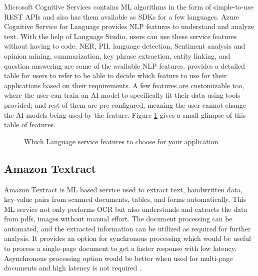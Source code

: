 Microsoft Cognitive Services contains \acs{ML} algorithms in the form of simple-to-use \acs{REST} \acs{API}s and also has them available as \acs{SDK}s for a few languages\cite{azureCogServices}. Azure Cognitive Service for Language\cite{urlAzureCogLangOverview} provides \ac{NLP} features to understand and analyze text. With the help of Language Studio, users can use these service features without having to code. \ac{NER}, \ac{PII}, language detection, Sentiment analysis and opinion mining, summarization, key phrase extraction, entity linking, and question answering are some of the available \acs{NLP} features. \cite{urlAzureCogLangNLPfeatures} provides a detailed table for users to refer to be able to decide which feature to use for their applications based on their requirements. A few features are customizable too, where the user can train an \acs{AI} model to specifically fit their data using tools provided; and rest of them are pre-configured, meaning the user cannot change the \acs{AI} models being used by the feature. Figure \ref{azureNLPfeatures} gives a small glimpse of this table of features.

\begin {figure}[ht]
\centering
{}
\caption{Which Language service features to choose for your application}
\label{azureNLPfeatures}
\end {figure}

\subsection{Amazon Textract}
Amazon Textract \cite{urlAmazonTextract}\cite{archivedTextract} is \acs{ML} based service used to extract text, handwritten data, key-value pairs from scanned documents, tables, and forms automatically. This \acs{ML} service not only performs \ac{OCR} but also understands and extracts the data from \acs{pdf}s, images without manual effort. The document processing can be automated, and the extracted information can be utilized as required for further analysis. It provides an option for synchronous processing which would be useful to process a single-page document to get a faster response with low latency. Asynchronous processing option would be better when used for multi-page documents and high latency is not required \cite{archivedTextract}.

